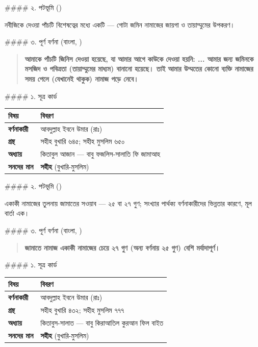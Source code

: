 \#\#\#\# ২. পটভূমি ()

নবীজিকে দেওয়া পাঁচটি বিশেষত্বের মধ্যে একটি — গোটা জমিন নামাজের জায়গা ও তায়াম্মুমের উপকরণ।

\#\#\#\# ৩. পূর্ণ বর্ণনা (বাংলা, )

\begin{quote}
\textbf{আমাকে পাঁচটি জিনিস দেওয়া হয়েছে, যা আমার আগে কাউকে দেওয়া হয়নি: ... আমার জন্য জমিনকে মসজিদ ও পবিত্রতা (তায়াম্মুমের মাধ্যম) বানানো হয়েছে। তাই আমার উম্মতের কোনো ব্যক্তি নামাজের সময় পেলে (যেখানেই থাকুক) নামাজ পড়ে নেবে।}
\end{quote}

\#\#\#\# ১. সূত্র কার্ড

\begin{table}[h]\centering\small
\begin{tabular}{ll}
বিষয় & বিবরণ \\
\hline
\textbf{বর্ণনাকারী} & আবদুল্লাহ ইবনে উমার (রাঃ) \\
\textbf{গ্রন্থ} & সহীহ বুখারি ৬৪৫; সহীহ মুসলিম ৬৫০ \\
\textbf{অধ্যায়} & কিতাবুল আজান — বাবু ফজলিস-সালাতি ফি জামাআহ \\
\textbf{সনদের মান} & \textbf{সহীহ} (বুখারি-মুসলিম) \\
\hline
\end{tabular}
\end{table}

\#\#\#\# ২. পটভূমি ()

একাকী নামাজের তুলনায় জামাতের সওয়াব — ২৫ বা ২৭ গুণ; সংখ্যার পার্থক্য বর্ণনাকারীদের ভিন্নতার কারণে, মূল বার্তা এক।

\#\#\#\# ৩. পূর্ণ বর্ণনা (বাংলা, )

\begin{quote}
\textbf{জামাতে নামাজ একাকী নামাজের চেয়ে ২৭ গুণ (অন্য বর্ণনায় ২৫ গুণ) বেশি মর্যাদাপূর্ণ।}
\end{quote}

\#\#\#\# ১. সূত্র কার্ড

\begin{table}[h]\centering\small
\begin{tabular}{ll}
বিষয় & বিবরণ \\
\hline
\textbf{বর্ণনাকারী} & আবদুল্লাহ ইবনে উমার (রাঃ) \\
\textbf{গ্রন্থ} & সহীহ বুখারি ৪৩২; সহীহ মুসলিম ৭৭৭ \\
\textbf{অধ্যায়} & কিতাবুস-সালাত — বাবু কিরাআতিল কুরআন ফিল বাইত \\
\textbf{সনদের মান} & \textbf{সহীহ} (বুখারি-মুসলিম) \\
\hline
\end{tabular}
\end{table}


